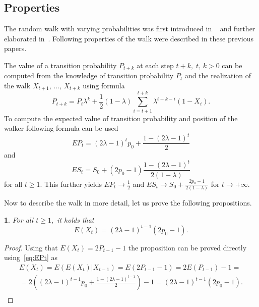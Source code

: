 \documentclass{amsart}
\theoremstyle{definition}
\theoremstyle{plain}
\newtheorem{prop}[thm]{\protect\propositionname}
\theoremstyle{plain}
\theoremstyle{plain}
\numberwithin{equation}{section}
\providecommand{\propositionname}{Proposition}
\begin{document}
    \subsection{Properties}\label{subsec:properties}

    The random walk with varying probabilities was first introduced in
    ~\cite{ja2017ddny} and further elaborated in~\cite{ja2019teze}.
    Following properties of the walk were described in these previous
    papers.

    The value of a transition probability $P_{t+k}$ at
    each step $t+k,\;t,\,k>0$ can be computed from the knowledge of
    transition probability $P_{t}$ and the realization of the walk
    $X_{t+1},\,\dots,\,X_{t+k}$ using formula
    \begin{equation}
        P_{t+k}=P_{t}\lambda^{k}+\frac{1}{2}(1-\lambda)\sum_{i=t+1}^{t+k}\lambda^{t+k-i}(1-X_{i}).\label{eq:Pt}
    \end{equation}
    To compute the expected value of transition probability and position of the walker following formula can be used
    \begin{equation}
        EP_{t}=(2\lambda-1)^{t}p_{0}+\frac{1-(2\lambda-1)^{t}}{2}\label{eq:EPt}
    \end{equation}
    and
    \begin{equation}
        ES_{t}=S_{0}+(2p_{0}-1)\frac{1-(2\lambda-1)^{t}}{2(1-\lambda)}\label{eq:ESt}
    \end{equation}
    for all $t\geq1$.
    This further yields $EP_{t}\rightarrow\frac{1}{2}$
    and $ES_{t}\rightarrow S_{0}+\frac{2p_{0}-1}{2(1-\lambda)}$ for $t\rightarrow+\infty$.

    Now to describe the walk in more detail, let us
    prove the following propositions.

    \begin{prop}
        \label{PropEXt-succes}
        For all $t\geq1,$ it holds that
        \begin{equation}
            E(X_{t})=(2\lambda-1)^{t-1}(2p_{0}-1).
        \end{equation}
    \end{prop}
    \begin{proof}
        Using that $E(X_{t})=2P_{t-1}-1$ the proposition can be
        proved directly using~\eqref{eq:EPt} as
        \begin{gather*}
            E(X_{t})=E(E(X_{t})|X_{t-1})=E(2P_{t-1}-1)=2E(P_{t-1})-1=\\
            =2((2\lambda-1)^{t-1}p_{0}+\frac{1-(2\lambda-1)^{t-1}}{2})-1=(2\lambda-1)^{t-1}(2p_{0}-1).\\
        \end{gather*}
    \end{proof}
\end{document}
